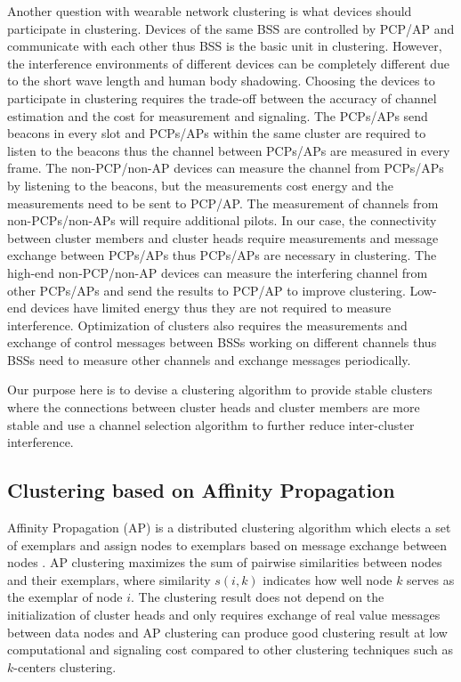 \documentclass[10pt, conference, letterpaper]{IEEEtran}
\begin{document}
Another question with wearable network clustering is what devices should participate in clustering. Devices of the same BSS are controlled by PCP/AP and communicate with each other thus BSS is the basic unit in clustering. However, the interference environments of different devices can be completely different due to the short wave length and human body shadowing. Choosing the devices to participate in clustering requires the trade-off between the accuracy of channel estimation and the cost for measurement and signaling. 
The PCPs/APs send beacons in every slot and PCPs/APs within the same cluster are required to listen to the beacons thus the channel between PCPs/APs are measured in every frame. The non-PCP/non-AP devices can measure the channel from PCPs/APs by listening to the beacons, but the measurements cost energy and the measurements need to be sent to PCP/AP. The measurement of channels from non-PCPs/non-APs will require additional pilots. In our case, the connectivity between cluster members and cluster heads require measurements and message exchange between PCPs/APs thus PCPs/APs are necessary in clustering. The high-end non-PCP/non-AP devices can measure the interfering channel from other PCPs/APs and send the results to PCP/AP to improve clustering. Low-end devices have limited energy thus they are not required to measure interference. %
Optimization of clusters also requires the measurements and exchange of control messages between BSSs working on different channels thus BSSs need to measure other channels and exchange messages periodically. 

Our purpose here is to devise a clustering algorithm to provide stable clusters where the connections between cluster heads and cluster members are more stable and use a channel selection algorithm to further reduce inter-cluster interference.

\subsection{Clustering based on Affinity Propagation}
Affinity Propagation (AP) \cite{apcluster} is a distributed clustering algorithm which elects a set of exemplars and assign nodes to exemplars based on message exchange between nodes . AP clustering maximizes the sum of pairwise similarities between nodes and their exemplars, where similarity $s(i,k)$ indicates how well node $k$ serves as the exemplar of node $i$. The clustering result does not depend on the initialization of cluster heads and only requires exchange of real value messages between data nodes and AP clustering can produce good clustering result at low computational and signaling cost compared to other clustering techniques such as $k$-centers clustering.
\end{document}
